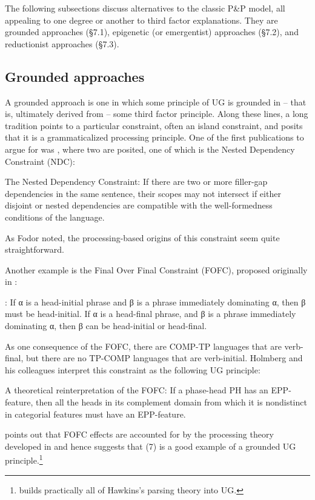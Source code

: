 \documentclass[output=paper,
modfonts
]{LSP/langsci}
\begin{document}
The following subsections discuss alternatives to the classic P\&P
model, all appealing to one degree or another to third factor
explanations. They are grounded approaches (§7.1), epigenetic (or
emergentist) approaches (§7.2), and reductionist approaches (§7.3).

\subsection{Grounded approaches}
A grounded approach is one in which some principle of UG is grounded in
 --  that is, ultimately derived from  --  some third factor principle.
Along these lines, a long tradition points to a particular constraint,
often an island constraint, and posits that it is a grammaticalized
processing principle. One of the first publications to argue for
 was \citet{fodor1978}, where two  are
posited, one of which is the Nested Dependency Constraint (NDC):

\ea The Nested Dependency Constraint: If there are two or more
filler-gap dependencies in the same sentence, their scopes may not
intersect if either disjoint or nested dependencies are compatible with
the well-formedness conditions of the language.
\z

As Fodor noted, the processing-based origins of this constraint seem
quite straightforward.

Another example is the Final Over Final Constraint (FOFC), proposed
originally in \citet{holmberg2000}:

\ea {}: If α is a head-initial phrase and β is
a phrase immediately dominating α, then β must be head-initial. If α is
a head-final phrase, and β is a phrase immediately dominating α, then β
can be head-initial or head-final.
\z

As one consequence of the FOFC, there are COMP-TP languages that are
verb-final, but there are no TP-COMP languages that are verb-initial.
Holmberg and his colleagues interpret this constraint as the following
UG principle:

\ea A theoretical reinterpretation of the FOFC: If a phase-head PH has
an EPP-feature, then all the heads in its complement domain from which
it is nondistinct in categorial features must have an EPP-feature. \citep[13]{biberauer2008}
\z 

\citet{walkden2009} points out that FOFC effects are accounted for by the
processing theory developed in \citet{hawkins2004} and hence suggests that
(7) is a good example of a grounded UG principle.\footnote{\citet{mobbs2014}
  builds practically all of Hawkins's parsing theory into UG.}
\end{document}
